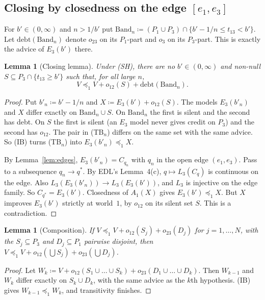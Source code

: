 \documentclass[11pt]{article}
\newtheorem{lemma}[theorem]{Lemma}
\theoremstyle{definition}\newtheorem{definition}[theorem]{Definition}
\theoremstyle{remark}\newtheorem{remark}[theorem]{Remark}
\begin{document}
\subsection*{Closing by closedness on the edge $[e_1,e_3]$}

For $b'\in(0,\infty)$ and $n>1/b'$ put
$\mathrm{Band}_n\coloneqq(P_1\cup P_3)\cap\{b'-1/n\le t_{13}<b'\}$. Let
$\mathrm{debt}(\mathrm{Band}_n)$ denote $o_{23}$ on its $P_1$-part and $o_3$ on
its $P_3$-part. This is exactly the advice of $E_3(b')$ there.

\begin{lemma}[Closing lemma]\label{lem:closing}
Under (SH), there are no $b'\in(0,\infty)$ and non-null
$S\subseteq P_3\cap\{t_{13}\ge b'\}$ such that, for all large $n$,
\[
 V\preceq_1V+o_{12}(S)+\mathrm{debt}(\mathrm{Band}_n).\tag{TB$_n$}
\]
\end{lemma}
\begin{proof}
Put $b'_n\coloneqq b'-1/n$ and $X\coloneqq E_3(b')+o_{12}(S)$. The models
$E_3(b'_n)$ and $X$ differ exactly on $\mathrm{Band}_n\cup S$. On
$\mathrm{Band}_n$ the first is silent and the second has debt. On $S$ the
first is silent (an $E_3$ model never gives credit on $P_3$) and the second
has $o_{12}$. The pair in (TB$_n$) differs on the same set with the same
advice. So (IB) turns (TB$_n$) into $E_3(b'_n)\preceq_1X$.

By Lemma~\ref{lem:edges}, $E_3(b'_n)=C_{q_n}$ with $q_n$ in the open edge
$(e_1,e_3)$. Pass to a subsequence $q_n\to q^*$. By EDL's Lemma~4(c),
$q\mapsto L_3(C_q)$ is continuous on the edge. Also
$L_3(E_3(b'_n))\to L_3(E_3(b'))$, and $L_3$ is injective on the edge family.
So $C_{q^*}=E_3(b')$. Closedness of $A_1(X)$ gives $E_3(b')\preceq_1X$. But
$X$ improves $E_3(b')$ strictly at world~$1$, by $o_{12}$ on its silent set
$S$. This is a contradiction.
\end{proof}

\begin{lemma}[Composition]\label{lem:compose}
If $V\preceq_1V+o_{12}(S_j)+o_{23}(D_j)$ for $j=1,\dots,N$, with the
$S_j\subseteq P_3$ and $D_j\subseteq P_1$ pairwise disjoint, then
$V\preceq_1V+o_{12}(\bigcup S_j)+o_{23}(\bigcup D_j)$.
\end{lemma}
\begin{proof}
Let $W_k\coloneqq V+o_{12}(S_1\cup\dots\cup S_k)+o_{23}(D_1\cup\dots\cup D_k)$.
Then $W_{k-1}$ and $W_k$ differ exactly on $S_k\cup D_k$, with the same advice
as the $k$th hypothesis. (IB) gives $W_{k-1}\preceq_1W_k$, and transitivity
finishes.
\end{proof}
\end{document}
